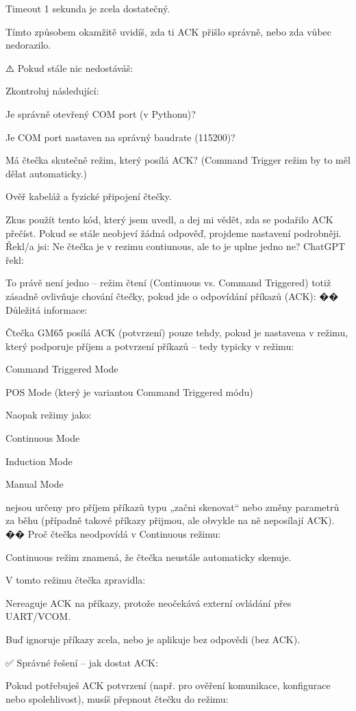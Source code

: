     Timeout 1 sekunda je zcela dostatečný.

    Tímto způsobem okamžitě uvidíš, zda ti ACK přišlo správně, nebo zda vůbec nedorazilo.

⚠️ Pokud stále nic nedostáváš:

Zkontroluj následující:

    Je správně otevřený COM port (v Pythonu)?

    Je COM port nastaven na správný baudrate (115200)?

    Má čtečka skutečně režim, který posílá ACK? (Command Trigger režim by to měl dělat automaticky.)

    Ověř kabeláž a fyzické připojení čtečky.

Zkus použít tento kód, který jsem uvedl, a dej mi vědět, zda se podařilo ACK přečíst. Pokud se stále neobjeví žádná odpověď, projdeme nastavení podrobněji.
Řekl/a jsi:
Ne čtečka je v rezimu contiunous, ale to je uplne jedno ne?
ChatGPT řekl:

To právě není jedno – režim čtení (Continuous vs. Command Triggered) totiž zásadně ovlivňuje chování čtečky, pokud jde o odpovídání příkazů (ACK):
�� Důležitá informace:

Čtečka GM65 posílá ACK (potvrzení) pouze tehdy, pokud je nastavena v režimu, který podporuje příjem a potvrzení příkazů – tedy typicky v režimu:

    Command Triggered Mode

    POS Mode (který je variantou Command Triggered módu)

Naopak režimy jako:

    Continuous Mode

    Induction Mode

    Manual Mode

nejsou určeny pro příjem příkazů typu „začni skenovat“ nebo změny parametrů za běhu (případně takové příkazy přijmou, ale obvykle na ně neposílají ACK).
�� Proč čtečka neodpovídá v Continuous režimu:

    Continuous režim znamená, že čtečka neustále automaticky skenuje.

    V tomto režimu čtečka zpravidla:

        Nereaguje ACK na příkazy, protože neočekává externí ovládání přes UART/VCOM.

        Buď ignoruje příkazy zcela, nebo je aplikuje bez odpovědi (bez ACK).

✅ Správné řešení – jak dostat ACK:

Pokud potřebuješ ACK potvrzení (např. pro ověření komunikace, konfigurace nebo spolehlivost), musíš přepnout čtečku do režimu:

